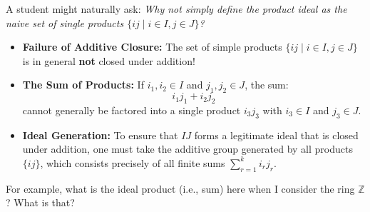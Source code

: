 \begin{content}

\begin{steps}
A student might naturally ask: \emph{Why not simply define the product ideal as the naive set of single products $\{ i j \mid i \in I, j \in J \}$?}
\begin{itemize}
    \item \textbf{Failure of Additive Closure:} The set of simple products $\{ i j \mid i \in I, j \in J \}$ is in general \textbf{not} closed under addition!
    \item \textbf{The Sum of Products:} If $i_1, i_2 \in I$ and $j_1, j_2 \in J$, the sum:
    \[
    i_1 j_1 + i_2 j_2
    \]
    cannot generally be factored into a single product $i_3 j_3$ with $i_3 \in I$ and $j_3 \in J$.
    \item \textbf{Ideal Generation:} To ensure that $IJ$ forms a legitimate ideal that is closed under addition, one must take the additive group generated by all products $\{ij\}$, which consists precisely of all finite sums $\sum_{r=1}^k i_r j_r$.
\end{itemize}
\end{steps}
\end{content}

\begin{speech}[01:14:40 - 01:14:51]
For example, what is the ideal product (i.e., sum) here when I consider the ring $\mathbb{Z}$?  What is that?
\end{speech}


